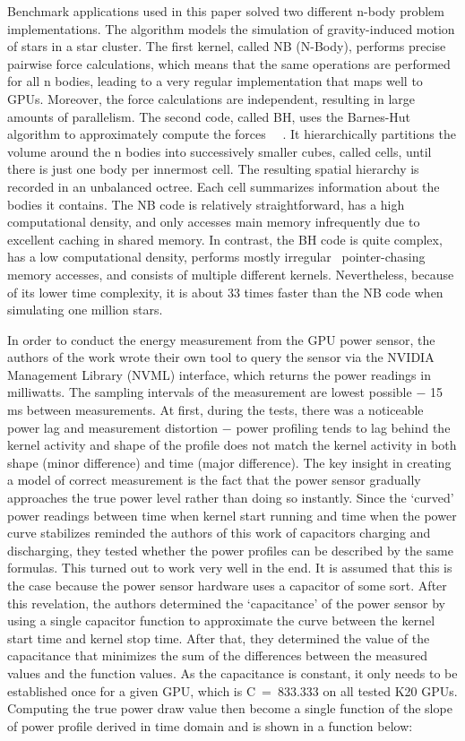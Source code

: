 Benchmark applications used in this paper solved two different
n-body problem implementations. The algorithm models the simulation
of gravity-induced motion of stars in a star cluster. The first
kernel, called NB (N-Body), performs precise pairwise force
calculations, which means that the same operations are performed
for all n bodies, leading to a very regular implementation that
maps well to GPUs. Moreover, the force calculations are
independent, resulting in large amounts of parallelism. The second
code, called BH, uses the Barnes-Hut algorithm to approximately
compute the forces~\cite{O(N)_Force_Calculation_Algorithm}
~\cite{LonestarGPU}. It hierarchically partitions the
volume around the n bodies into successively smaller cubes, called
cells, until there is just one body per innermost cell. The
resulting spatial hierarchy is recorded in an unbalanced octree.
Each cell summarizes information about the bodies it contains. The
NB code is relatively straightforward, has a high computational
density, and only accesses main memory infrequently due to
excellent caching in shared memory. In contrast, the BH code is
quite complex, has a low computational density, performs mostly
irregular~\cite{Irregular_Programs_GPUs_Study} pointer-chasing
memory accesses, and consists of multiple different kernels.
Nevertheless, because of its lower time complexity, it is about
33 times faster than the NB code when simulating one million stars.

In order to conduct the energy measurement from the GPU power
sensor, the authors of the work wrote their own tool to query the
sensor via the NVIDIA Management Library (NVML) interface, which
returns the power readings in milliwatts. The sampling intervals
of the measurement are lowest possible $-$ 15 ms between
measurements. At first, during the tests, there was a noticeable
power lag and measurement distortion $-$ power profiling tends to
lag behind the kernel activity and shape of the profile does not
match the kernel activity in both shape (minor difference) and time
(major difference). The key insight in creating a model of correct
measurement is the fact that the power sensor gradually approaches
the true power level rather than doing so instantly. Since the
`curved' power readings between time when kernel start running and
time when the power curve stabilizes reminded the authors of this
work of capacitors charging and discharging, they tested whether
the power profiles can be described by the same formulas. This
turned out to work very well in the end. It is assumed that this
is the case because the power sensor hardware uses a capacitor of
some sort. After this revelation, the authors determined the 
`capacitance' of the power sensor by using a single capacitor
function to approximate the curve between the kernel start time
and kernel stop time. After that, they determined the value of the
capacitance that minimizes the sum of the differences between the
measured values and the function values. As the capacitance is
constant, it only needs to be established once for a given GPU,
which is C~=~833.333 on all tested K20 GPUs. Computing the true
power draw value then become a single function of the slope of
power profile derived in time domain and is shown in a function
below:

